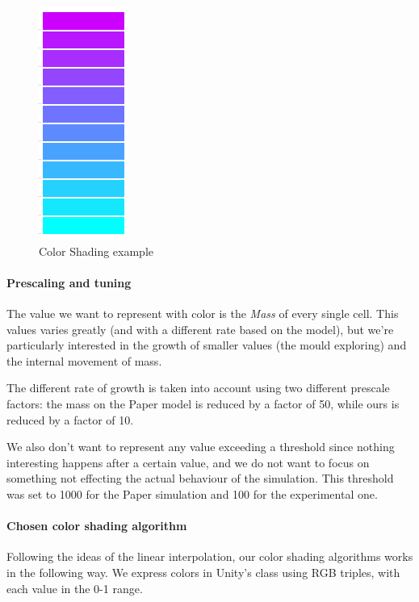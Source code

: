 \begin{figure}
  \centering
    \includegraphics{colorshade1}%
    
  \caption{Color Shading example}
  \label{fig:color}
\end{figure}


\paragraph{Prescaling and tuning}

The value we want to represent with color is the \textit{Mass} of every single cell. This values varies greatly (and with a different rate based on the model), but we're particularly interested in the growth of smaller values (the mould exploring) and the internal movement of mass.

The different rate of growth is taken into account using two different prescale factors: the mass on the Paper model is reduced by a factor of 50, while ours is reduced by a factor of 10.

We also don't want to represent any value exceeding a threshold since nothing interesting happens after a certain value, and we do not want to focus on something not effecting the actual behaviour of the simulation. This threshold was set to 1000 for the Paper simulation and 100 for the experimental one.

\paragraph{Chosen color shading algorithm}

Following the ideas of the linear interpolation, our color shading algorithms works in the following way. We express colors in Unity's class using RGB triples, with each value in the 0-1 range.\\

